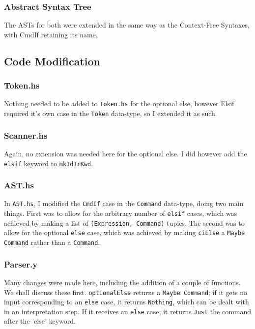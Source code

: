 \documentclass[12pt]{article}
\newcommand{\lstin}[3]{
  
}
\begin{document}
\subsubsection{Abstract Syntax Tree}
The ASTs for both were extended in the same way as the Context-Free Syntaxes, with CmdIf retaining its name.

\subsection{Code Modification}
\subsubsection{Token.hs}
Nothing needed to be added to \verb|Token.hs| for the optional else, however Elsif required it's own case in the \verb|Token| data-type, so I extended it as such.

\lstin{49}{49}{Token.hs}

\subsubsection{Scanner.hs}
Again, no extension was needed here for the optional else. 
I did however add the \verb|elsif| keyword to \verb|mkIdIrKwd|.

\lstin{157}{157}{Scanner.hs}

\subsubsection{AST.hs}
In \verb|AST.hs|, I modified the \verb|CmdIf| case in the \verb|Command| data-type, doing two main things. 
First was to allow for the arbitrary number of \verb|elsif| cases, which was achieved by making a list of \verb|(Expression, Command)| tuples. 
The second was to allow for the optional \verb|else| case, which was achieved by making \verb|ciElse| a \verb|Maybe Command| rather than a \verb|Command|.

\lstin{101}{105}{AST.hs}

\subsubsection{Parser.y}
Many changes were made here, including the addition of a couple of functions. 
We shall discuss these first. 
\verb|optionalElse| returns a \verb|Maybe Command|; if it gets no input corresponding to an \verb|else| case, it returns \verb|Nothing|, which can be dealt with in an interpretation step. 
If it receives an \verb|else| case, it returns \verb|Just| the command after the 'else' keyword.
\end{document}

